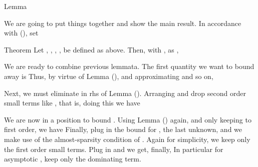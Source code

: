 \Result
{Lemma}
{
}

\stopsection

\startsection [title={The Main Result}]

We are going to put things together and show the main result.
In accordance with (), set

\Result
{Theorem}
{
Let , , , ,  be defined as above.
Then, with , as ,
}

We are ready to combine previous lemmata.
The first quantity we want to bound away is
Thus, by virtue of Lemma (), and approximating  and so on,

Next, we must eliminate  in rhs of Lemma ().
Arranging and drop second order small terms like , that is,
doing this we have

We are now in a position to bound .
Using Lemma () again, and only keeping to first order, we have
Finally, plug in the bound for , the last unknown, and we make use of the almost-sparsity condition of .
Again for simplicity, we keep only the first order small terms.
Plug in  and  we get, finally,
In particular for asymptotic , keep only the dominating term.

